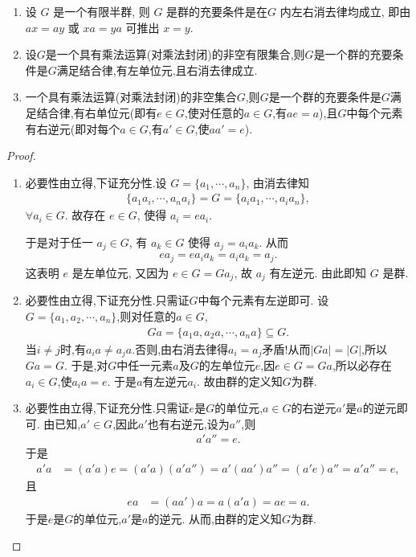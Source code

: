 \documentclass[../../main.tex]{subfiles}%
\begin{document}
\begin{theorem}
\begin{enumerate}[(1)]
\item 设 $G$ 是一个有限半群, 则 $G$ 是群的充要条件是在$G$ 内左右消去律均成立, 即由 $ax=ay$ 或 $xa=ya$ 可推出 $x=y$.

\item 设$G$是一个具有乘法运算(对乘法封闭)的非空有限集合,则$G$是一个群的充要条件是$G$满足结合律,有左单位元,且右消去律成立.

\item 一个具有乘法运算(对乘法封闭)的非空集合$G$,则$G$是一个群的充要条件是$G$满足结合律,有右单位元(即有$e \in G$,使对任意的$a \in G$,有$ae = a$),且$G$中每个元素有右逆元(即对每个$a \in G$,有$a' \in G$,使$aa' = e$).
\end{enumerate}
\end{theorem}
\begin{proof}
\begin{enumerate}[(1)]
\item 必要性由立得,下证充分性.设 $G=\{a_1,\cdots,a_n\}$, 由消去律知
\begin{align*}
\{a_1a_i,\cdots,a_na_i\}=G=\{a_ia_1,\cdots,a_ia_n\},
\end{align*}
$\forall a_i\in G$. 故存在 $e\in G$, 使得 $a_i=ea_i$.

于是对于任一 $a_j\in G$, 有 $a_k\in G$ 使得 $a_j=a_i a_k$. 从而
\begin{align*}
ea_j=ea_i a_k=a_i a_k=a_j.
\end{align*}
这表明 $e$ 是左单位元, 又因为 $e\in G=G a_j$, 故 $a_j$ 有左逆元. 由此即知 $G$ 是群.

\item 必要性由立得,下证充分性.只需证$G$中每个元素有左逆即可.
设$G = \{a_1,a_2,\cdots,a_n\}$,则对任意的$a \in G$,
\begin{align*}
Ga = \{a_1a,a_2a,\cdots,a_na\} \subseteq G.
\end{align*}
当$i \neq j$时,有$a_i a \neq a_j a$.否则,由右消去律得$a_i=a_j$矛盾!从而$|Ga| = |G|$,所以$Ga = G$. 于是,对$G$中任一元素$a$及$G$的左单位元$e$,因$e \in G = Ga$,所以必存在$a_i \in G$,使$a_i a = e$. 于是$a$有左逆元$a_i$. 故由群的定义知$G$为群.

\item 必要性由立得,下证充分性.只需证$e$是$G$的单位元,$a \in G$的右逆元$a'$是$a$的逆元即可.
由已知,$a' \in G$,因此$a'$也有右逆元,设为$a''$,则
\begin{align*}
a' a'' = e.
\end{align*}
于是
\begin{align*}
a' a &= (a' a)e = (a' a)(a' a'') = a'(aa')a'' = (a' e)a'' = a' a'' = e,
\end{align*}
且
\begin{align*}
ea &= (aa')a = a(a' a) = ae = a.
\end{align*}
于是$e$是$G$的单位元,$a'$是$a$的逆元. 从而,由群的定义知$G$为群.
\end{enumerate}
\end{proof}
\end{document}
